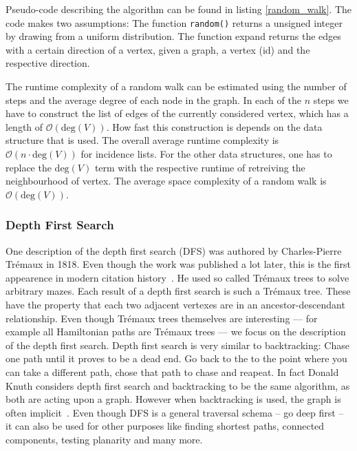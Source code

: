             Pseudo-code describing the algorithm can be found in listing \ref{random_walk}. 
            The code makes two assumptions: The function \texttt{random()} returns a unsigned integer by drawing from a uniform distribution. 
            The function expand returns the edges with a certain direction of a vertex, given a graph, a vertex (id) and the respective direction.
            
            The runtime complexity of a random walk can be estimated using the number of steps and the average degree of each node in the graph. 
            In each of the $n$ steps we have to construct the list of edges of the currently considered vertex, which has a length of $\mathcal{O}(\text{deg}(V))$. 
            How fast this construction is depends on the data structure that is used. 
            The overall average runtime complexity is $\mathcal{O}(n \cdot \text{deg}(V))$ for incidence lists. 
            For the other data structures, one has to replace the $\text{deg}(V)$ term with the respective runtime of retreiving the neighbourhood of vertex. 
            The average space complexity of a random walk is $\mathcal{O}(\text{deg}(V))$.

        \subsubsection*{Depth First Search}
        One description of the depth first search (DFS) was authored by Charles-Pierre Trémaux in 1818.
        Even though the work was published a lot later, this is the first appearence in modern citation history~\autocite{lucas1891recreations}. 
        He used so called Trémaux trees to solve arbitrary mazes. 
        Each result of a depth first search is such a Trémaux tree.
        These have the property that each two adjacent vertexes are in an ancestor-descendant relationship.
        Even though Trémaux trees themselves are interesting --- for example all Hamiltonian paths are Trémaux trees --- we focus on the description of the depth first search.        
        Depth first search is very similar to backtracking: Chase one path until it proves to be a dead end. 
        Go back to the to the point where you can take a different path, chose that path to chase and reapeat. 
        In fact Donald Knuth considers depth first search and backtracking to be the same algorithm, as both are acting upon a graph. 
        However when backtracking is used, the graph is often implicit~\autocite{Knuth2000DancingL}.        
        Even though DFS is a general traversal schema -- go deep first -- it can also be used for other purposes like finding shortest paths, connected components, testing planarity and many more. 
                
